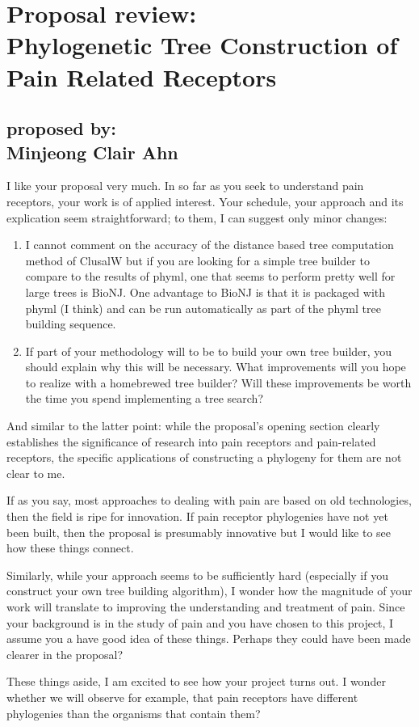 \documentclass[12pt,draft,a4paper]{article}
\begin{document}
 


\section*{Proposal review:\\ Phylogenetic Tree Construction of Pain Related Receptors}
\subsection*{proposed by:\\ Minjeong Clair Ahn}

I like your proposal very much. In so far as you seek to understand pain receptors, your work is of applied interest. Your schedule, your approach and its explication seem straightforward; to them, I can suggest only minor changes:

\begin{enumerate}
\item{I cannot comment on the accuracy of the distance based tree computation method of ClusalW but if you are looking for a simple tree builder to compare to the results of phyml, one that seems to perform pretty well for large trees is BioNJ. One advantage to BioNJ is that it is packaged with phyml (I think) and can be run automatically as part of the phyml tree building sequence.
}
\item{If part of your methodology will to be to build your own tree builder, you should explain why this will be necessary. What improvements will you hope to realize with a homebrewed tree builder? Will these improvements be worth the time you spend implementing a tree search?
}



\end{enumerate}

And similar to the latter point: while the proposal's opening section clearly establishes the significance of research into pain receptors and pain-related receptors, the specific applications of constructing a phylogeny for them are not clear to me. 

If as you say, most approaches to dealing with pain are based on old technologies, then the field is ripe for innovation. If pain receptor phylogenies have not yet been built, then the proposal is presumably innovative but I would like to see how these things connect. 

Similarly, while your approach seems to be sufficiently hard (especially if you construct your own tree building algorithm), I wonder how the magnitude of your work will translate to improving the understanding and treatment of pain. Since your background is in the study of pain and you have chosen to this project, I assume you a have good idea of these things. Perhaps they could have been made clearer in the proposal?

These things aside, I am excited to see how your project turns out. I wonder whether we will observe for example, that pain receptors have different phylogenies than the organisms that contain them?


\end{document}
